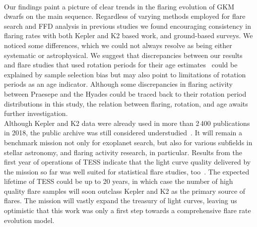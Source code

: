 \documentclass{aa}
\begin{document}
\\
Our findings paint a picture of clear trends in the flaring evolution of GKM dwarfs on the main sequence. Regardless of varying methods employed for flare search and FFD analysis in previous studies we found encouraging consistency in flaring rates with both Kepler and K2 based work, and ground-based surveys. We noticed some differences, which we could not always resolve as being either systematic or astrophysical. We suggest that discrepancies between our results and flare studies that used rotation periods for their age estimates~\citep{davenport2019, raetz2020} could be explained by sample selection bias but may also point to limitations of rotation periods as an age indicator. Although some discrepancies in flaring activity between Praesepe and the Hyades could be traced back to their rotation period distributions in this study, the relation between flaring, rotation, and age awaits further investigation.
\\
Although Kepler and K2 data were already used in more than 2\,400 publications in 2018, the public archive was still considered understudied~\citep{barentsen_retirement_opportunities_2018}. It will remain a benchmark mission not only for exoplanet search, but also for various subfields in stellar astronomy, and flaring activity research, in particular. Results from the first year of operations of TESS indicate that the light curve quality delivered by the mission so far was well suited for statistical flare studies, too~\citep{doyle2020,guenther2020}. The expected lifetime of TESS could be up to 20 years, in which case the number of high quality flare samples will soon outclass Kepler and K2 as the primary source of flares. The mission will vastly expand the treasury of light curves, leaving us optimistic that this work was only a first step towards a comprehensive flare rate evolution model. %
\end{document}
